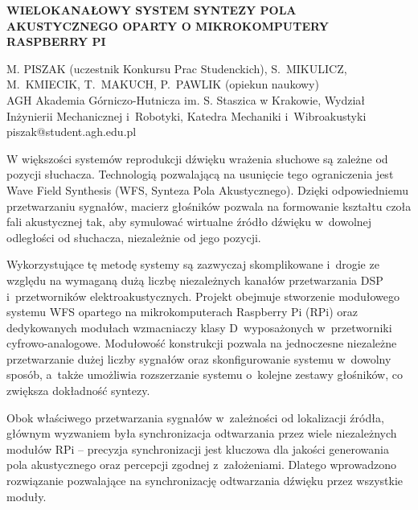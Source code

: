 \documentclass[10pt, a4paper]{article}
\begin{document}
\pagestyle{empty}

\begin{center}
  \large\textbf{\MakeUppercase{Wielokanałowy system syntezy pola akustycznego oparty o mikrokomputery Raspberry Pi}}
\end{center}
\vspace{22pt}

\noindent\MakeUppercase{M. Piszak} (uczestnik Konkursu Prac Studenckich), \MakeUppercase{S.~Mikulicz, M.~Kmiecik,} \linebreak \MakeUppercase{T.~Makuch, P.~Pawlik} (opiekun naukowy)\\

\noindent AGH Akademia Górniczo-Hutnicza im. S. Staszica w Krakowie, Wydział Inżynierii Mechanicznej i~Robotyki, Katedra Mechaniki i~Wibroakustyki
\\

\noindent piszak@student.agh.edu.pl

\vspace{22pt}

W większości systemów reprodukcji dźwięku wrażenia słuchowe są zależne od pozycji słuchacza. Technologią pozwalającą na usunięcie tego ograniczenia jest Wave Field Synthesis (WFS, Synteza Pola Akustycznego). Dzięki odpowiedniemu przetwarzaniu sygnałów, macierz głośników pozwala na formowanie kształtu czoła fali akustycznej tak, aby symulować wirtualne źródło dźwięku w~dowolnej odległości od słuchacza, niezależnie od jego pozycji.

Wykorzystujące tę metodę systemy są zazwyczaj skomplikowane i~drogie ze względu na wymaganą dużą liczbę niezależnych kanałów przetwarzania DSP i~przetworników elektroakustycznych. Projekt obejmuje stworzenie modułowego systemu WFS opartego na mikrokomputerach Raspberry Pi (RPi) oraz dedykowanych modułach wzmacniaczy klasy D~wyposażonych w~przetworniki cyfrowo-analogowe. Modułowość konstrukcji pozwala na jednoczesne niezależne przetwarzanie dużej liczby sygnałów oraz skonfigurowanie systemu w~dowolny sposób, a~także umożliwia rozszerzanie systemu o~kolejne zestawy głośników, co zwiększa dokładność syntezy.

Obok właściwego przetwarzania sygnałów w~zależności od lokalizacji źródła, głównym wyzwaniem była synchronizacja odtwarzania przez wiele niezależnych modułów RPi -- precyzja synchronizacji jest kluczowa dla jakości generowania pola akustycznego oraz percepcji zgodnej z~założeniami. Dlatego wprowadzono rozwiązanie pozwalające na synchronizację odtwarzania dźwięku przez wszystkie moduły.
\end{document}
